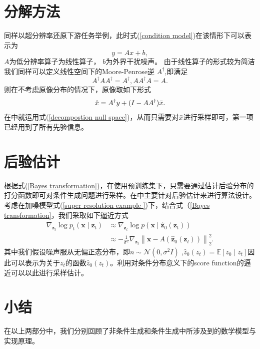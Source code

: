 \section{分解方法}
同样以超分辨率还原下游任务举例，此时式(\ref{condition model})在该情形下可以表示为
\begin{equation}
y  = A x +b,
    \label{super resolution example }
\end{equation}
$A$为低分辨率算子为线性算子， $b$为外界干扰噪声。 由于线性算子的形式较为简洁我们同样可以定义线性空间下的Moore-Penrose逆 $A^{\dagger}$,即满足 
\begin{equation}
   A^{\dagger} A A^{\dagger}= A^{\dagger} , AA^{\dagger}A = A.  
   \label{definition of moore-penrose inverse}
\end{equation}
则在不考虑原像分布的情况下，原像取如下形式
\begin{equation}
    \hat{x} = A^{\dagger} y + (I - A A^{\dagger})\Bar{x}. \label{decompostion null space}
\end{equation}
在\cite{ddnm}中就运用式(\ref{decompostion null space})，从而只需要对$\Bar{x}$进行采样即可，第一项已经用到了所有先验信息。 

\section{后验估计}
根据式(\ref{Bayes transformation})，在使用预训练集下，只需要通过估计后验分布的打分函数即可对条件生成问题进行采样。在\cite{Inverse,MCG}中主要针对后验估计来进行算法设计。 
考虑在加噪模型式(\ref{super resolution example })下，结合式（\ref{Bayes transformation}，我们采取如下逼近方式
\begin{align} \nabla_{\mathbf{z}_t} \log p_t\left(\mathbf{x} \mid \mathbf{z}_t\right) & \approx \nabla_{\mathbf{z}_t} \log p\left(\mathbf{x} \mid \hat{\mathbf{z}}_0\left(\mathbf{z}_t\right)\right) \\ & \approx-\frac{1}{\sigma^2} \nabla_{\mathbf{z}_t}\left\|\mathbf{x}-A\left(\hat{\mathbf{z}}_0\left(\mathbf{z}_t\right)\right)\right\|_2^2.\end{align}
其中我们假设噪声服从无偏正态分布，即$n\sim \mathcal{N}\left(0,\sigma^2 I\right)$ ,$\hat{z}_0(z_t) = \mathbb{E}\left[z_0\mid z_t\right]$因此可以表示为关于$z_t$的函数$\hat{z}_0(z_t)$。利用对条件分布意义下的score function的逼近可以以此进行采样估计。 

\section{小结}
在以上两部分中，我们分别回顾了非条件生成和条件生成中所涉及到的数学模型与实现原理。     

